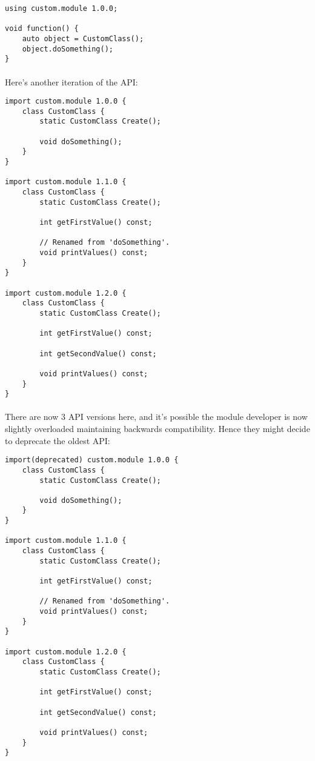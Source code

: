 \documentclass[12pt,twoside,notitlepage]{report}
\begin{document}
\begin{lstlisting}
using custom.module 1.0.0;

void function() {
	auto object = CustomClass();
	object.doSomething();
}
\end{lstlisting}

\paragraph{}
Here's another iteration of the API:

\begin{lstlisting}
import custom.module 1.0.0 {
	class CustomClass {
		static CustomClass Create();
		
		void doSomething();
	}
}

import custom.module 1.1.0 {
	class CustomClass {
		static CustomClass Create();
		
		int getFirstValue() const;
		
		// Renamed from 'doSomething'.
		void printValues() const;
	}
}

import custom.module 1.2.0 {
	class CustomClass {
		static CustomClass Create();
		
		int getFirstValue() const;
		
		int getSecondValue() const;
		
		void printValues() const;
	}
}
\end{lstlisting}

\paragraph{}
There are now 3 API versions here, and it's possible the module developer is now slightly overloaded maintaining backwards compatibility. Hence they might decide to deprecate the oldest API:

\begin{lstlisting}
import(deprecated) custom.module 1.0.0 {
	class CustomClass {
		static CustomClass Create();
		
		void doSomething();
	}
}

import custom.module 1.1.0 {
	class CustomClass {
		static CustomClass Create();
		
		int getFirstValue() const;
		
		// Renamed from 'doSomething'.
		void printValues() const;
	}
}

import custom.module 1.2.0 {
	class CustomClass {
		static CustomClass Create();
		
		int getFirstValue() const;
		
		int getSecondValue() const;
		
		void printValues() const;
	}
}
\end{lstlisting}
\end{document}
